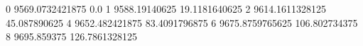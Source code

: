 0 9569.0732421875 0.0
1 9588.19140625 19.1181640625
2 9614.1611328125 45.087890625
4 9652.482421875 83.4091796875
6 9675.8759765625 106.802734375
8 9695.859375 126.7861328125
